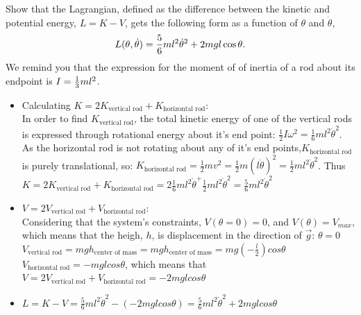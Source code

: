 \documentclass[11pt,a4paper]{report}
\newcounter{excount}[chapter]
\newenvironment{exercise}[1][]{\addtocounter{excount}{1} \noindent {\bf Problem
    \arabic{excount} \ \ #1}\hspace{2mm}}{\vspace{4mm}}
\begin{document}
\begin{exercise}
Show that the Lagrangian, defined as the difference between the kinetic and potential energy, $L=K-V$, gets the following form as a function of $\theta$ and $\dot\theta$,
\begin{equation}
L(\theta,\dot\theta)={5\over 6}m l^2\dot\theta^2+2mgl\cos\theta.
\end{equation}
We remind you that the expression for the moment of of inertia of a rod about its endpoint is $I={1\over 3}m l^2$.
\begin{itemize}
\item Calculating $K= 2 K_{\text{vertical rod}} + K_{\text{horizontal rod}}$: \\
In order to find $K_{\text{vertical rod}}$, the total kinetic energy of one of the vertical rods is expressed through rotational energy about it's end point: $\frac{1}{2}I\omega^2=\frac{1}{6}ml^2 \dot{\theta}^2$. As the horizontal rod is not rotating about any of it's end points,$ K_{\text{horizontal rod}}$ is purely translational, so: $K_{\text{horizontal rod}}=\frac{1}{2}mv^2=\frac{1}{2}m(l \dot{\theta})^2=\frac{1}{2}ml^2\dot{\theta}^2$. Thus $K= 2 K_{\text{vertical rod}} + K_{\text{horizontal rod}}=2 \frac{1}{6}ml^2 \dot{\theta}^ +\frac{1}{2}ml^2\dot{\theta}^2=\frac{5}{6} ml^2\dot{\theta}^2$
\item $V= 2 V_{\text{vertical rod}} + V_{\text{horizontal rod}}$:\\
Considering that the system's constraints, $V(\theta=0)=0$, and $V(\theta)=V_{max}$, which means that the heigh, $h$, is displacement in the direction of $\vec{g}$:  $\theta=0$ $V_{\text{vertical rod}}=mgh_{\text{center of mass}}=mgh_{\text{center of mass}}=mg (-\frac{l}{2}) cos \theta$ \\
$V_{\text{horizontal rod}}=-mgl cos\theta$, which means that $V= 2 V_{\text{vertical rod}} + V_{\text{horizontal rod}}=-2mgl cos \theta$
\item $L=K-V=\frac{5}{6} ml^2\dot{\theta}^2-(-2mgl cos \theta)=\frac{5}{6} ml^2\dot{\theta}^2+2mgl cos \theta$
\end{itemize}
\end{exercise}
\end{document}
